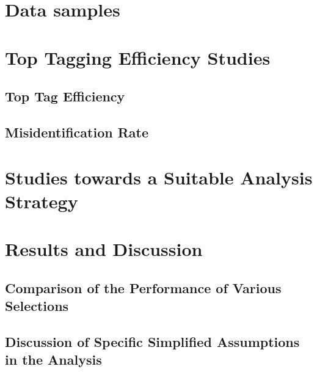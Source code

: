 \section{Data samples}
\label{sec:stop_samples}

\section{Top Tagging Efficiency Studies}
\label{sec:stop_toptagging}

\subsection{Top Tag Efficiency}
\label{subsec:stop_top_tag}

\subsection{Misidentification Rate}
\label{subsec:stop_misid}

\section{Studies towards a Suitable Analysis Strategy}
\label{sec:stop_cuts}

\section{Results and Discussion}
\label{sec:stop_results}

\subsection{Comparison of the Performance of Various Selections}
\label{subsec:stop_limits_comp}

\subsection{Discussion of Specific Simplified Assumptions in the Analysis }
\label{subsec:stop_discussion}
